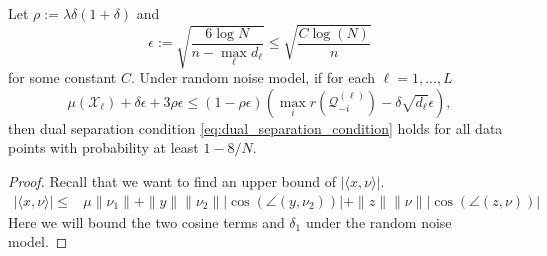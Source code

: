 \documentclass[twoside,11pt]{article}
\numberwithin{equation}{section}
\begin{document}
\begin{lemma}\label{lemma:dual_sep_random}
Let $\rho:=\lambda\delta(1+\delta)$ and
$$\epsilon := \sqrt{\frac{6\log N}{n-\max_{\ell}{d_{\ell}}}}\leq \sqrt{\frac{C\log(N)}{n}}$$ for some constant $C$. Under random noise model, if for each $\ell=1,...,L$
\begin{equation}\label{eq:dual_sep_random}
  \mu(\mathcal{X}_{\ell})+\delta\epsilon +3\rho\epsilon  \leq (1-\rho\epsilon)(\max_{i}r(\mathcal{Q}_{-i}^{(\ell)})-\delta\sqrt{d_{\ell}}\epsilon),
\end{equation}
then dual separation condition \eqref{eq:dual_separation_condition} holds for all data points with probability at least $1-8/N$.
\end{lemma}
\begin{proof}
Recall that we want to find an upper bound of $|\langle x, \nu \rangle|$.
\begin{equation}\label{eq:showing_dual_sep_cond_rand}
\begin{aligned}
    |\langle x, \nu \rangle| \leq& \mu \|\nu_1\|+ \|y\|\|\nu_2\||\cos(\angle (y,\nu_2))|
    + \|z\|\|\nu\||\cos(\angle (z,\nu))|
\end{aligned}
\end{equation}
Here we will bound the two cosine terms and $\delta_1$ under the random noise model.


\end{proof}
\end{document}
